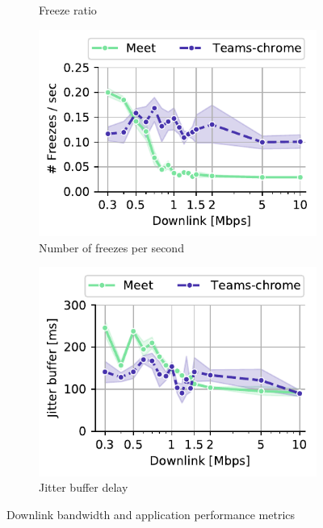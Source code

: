 \begin{figure}[]
\begin{subfigure}[t]{0.3\textwidth}
        \vspace{-2em}
        \caption{Freeze ratio}
 		\label{subfig:downlink_freeze_ratio}
    \end{subfigure}%
    \hfill
	\begin{subfigure}[t]{0.3\textwidth}   
        \centering
        \includegraphics[width=\textwidth]{figures/static/downlink_freezeCountPerSecond.pdf}
        \vspace{-2em}
    \caption{Number of freezes per second}
    \label{subfig:downlink_freeze_per_sec}
    \end{subfigure}%
    \hfill
	\begin{subfigure}[t]{0.3\textwidth}   
        \centering
        \includegraphics[width=\textwidth]{figures/static/downlink_jitter_buffer.pdf}
        \vspace{-2em}
    \caption{Jitter buffer delay}
    \label{subfig:downlink_jitter_buffer}
    \end{subfigure}
	\vspace{-1em}
	\caption{Downlink bandwidth and application performance metrics}
	\label{fig:downlink_application}
\end{figure}



